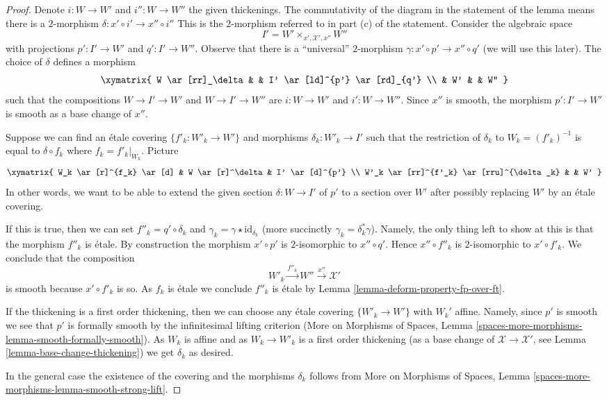 \begin{proof}
Denote $i : W \to W'$ and $i'' : W \to W''$ the given thickenings.
The commutativity of the diagram in the statement of the lemma
means there is a $2$-morphism $\delta : x' \circ i' \to x'' \circ i''$
This is the $2$-morphism referred to in part (c) of the statement.
Consider the algebraic space
$$
I' = W' \times_{x', \mathcal{X}', x''} W''
$$
with projections $p' : I' \to W'$ and $q' : I' \to W''$.
Observe that there is a ``universal'' $2$-morphism
$\gamma : x' \circ p' \to x'' \circ q'$ (we will use this later).
The choice of $\delta$ defines a morphism
$$
\xymatrix{
W \ar[rr]_\delta & & I' \ar[ld]^{p'} \ar[rd]_{q'} \\
& W' & & W''
}
$$
such that the compositions $W \to I' \to W'$ and $W \to I' \to W''$
are $i : W \to W'$ and $i' : W \to W''$.
Since $x''$ is smooth, the morphism $p' : I' \to W'$ is smooth
as a base change of $x''$.

\medskip\noindent
Suppose we can find an \'etale covering $\{f'_k : W'_k \to W'\}$
and morphisms $\delta_k : W'_k \to I'$ such that the restriction
of $\delta_k$ to $W_k = (f'_k)^{-1}$ is equal to $\delta \circ f_k$
where $f_k = f'_k|_{W_k}$. Picture
$$
\xymatrix{
W_k \ar[r]^{f_k} \ar[d] & W \ar[r]^\delta & I' \ar[d]^{p'} \\
W'_k \ar[rr]^{f'_k} \ar[rru]^{\delta_k} & & W'
}
$$
In other words, we want to be able to extend the given section
$\delta : W \to I'$ of $p'$ to a section over $W'$ after possibly
replacing $W'$ by an \'etale covering.

\medskip\noindent
If this is true, then we can set $f''_k = q' \circ \delta_k$
and $\gamma_k = \gamma \star \text{id}_{\delta_k}$ (more succinctly
$\gamma_k = \delta_k^*\gamma$). Namely, the only thing left to show
at this is that the morphism $f''_k$ is \'etale.
By construction the morphism $x' \circ p'$ is $2$-isomorphic
to $x'' \circ q'$. Hence $x'' \circ f''_k$ is $2$-isomorphic
to $x' \circ f'_k$. We conclude that the composition
$$
W'_k \xrightarrow{f''_k} W'' \xrightarrow{x''} \mathcal{X}'
$$
is smooth because $x' \circ f'_k$ is so.
As $f_k$ is \'etale we conclude $f''_k$ is \'etale
by Lemma \ref{lemma-deform-property-fp-over-ft}.

\medskip\noindent
If the thickening is a first order thickening, then we can
choose any \'etale covering $\{W'_k \to W'\}$ with $W_k'$ affine.
Namely, since $p'$ is smooth we see that $p'$ is formally smooth by the
infinitesimal lifting criterion (More on Morphisms of Spaces, Lemma
\ref{spaces-more-morphisms-lemma-smooth-formally-smooth}).
As $W_k$ is affine and as $W_k \to W'_k$ is a first order thickening
(as a base change of $\mathcal{X} \to \mathcal{X}'$, see
Lemma \ref{lemma-base-change-thickening}) we get $\delta_k$ as
desired.

\medskip\noindent
In the general case the existence of the covering and the morphisms
$\delta_k$ follows from More on Morphisms of Spaces, Lemma
\ref{spaces-more-morphisms-lemma-smooth-strong-lift}.
\end{proof}

